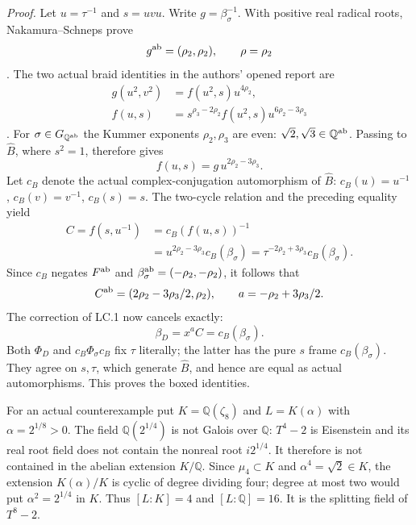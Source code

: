 \emph{Proof.}
Let $u=\tau^{-1}$ and $s=uvu$. Write $g=\beta_\sigma^{-1}$.
With positive real radical roots, Nakamura--Schneps prove
\[
 g^{\rm ab}=(\rho_2,\rho_2),\qquad \rho=\rho_2
\]
\cite[Proposition~2.4 and Definition~5.1]{LiftNakamuraSchneps2000}.
The two actual braid identities in the authors' opened report are
\begin{align*}
 g(u^2,v^2)&=f(u^2,s)u^{4\rho_2},\\
 f(u,s)&=s^{\rho_3-2\rho_2}f(u^2,s)u^{6\rho_2-3\rho_3}
\end{align*}
\cite[Theorem~2, $(\mathrm{GF}_1)$; Theorem~1, $(\mathrm V)$]
{LiftTsunogaiNakamura2002}.
For $\sigma\in G_{\mathbb Q^{\rm ab}}$ the Kummer exponents
$\rho_2,\rho_3$ are even: $\sqrt2,\sqrt3\in\mathbb Q^{\rm ab}$.
Passing to $\widehat B$, where $s^2=1$, therefore gives
\[
 f(u,s)=g\,u^{2\rho_2-3\rho_3}.
\]
Let $c_B$ denote the actual complex-conjugation automorphism of
$\widehat B$: $c_B(u)=u^{-1}$, $c_B(v)=v^{-1}$, $c_B(s)=s$.
The two-cycle relation and the preceding equality yield
\begin{align*}
 C=f(s,u^{-1})
   &=c_B(f(u,s))^{-1}\\
   &=u^{2\rho_2-3\rho_3}c_B(\beta_\sigma)
     =\tau^{-2\rho_2+3\rho_3}c_B(\beta_\sigma).
\end{align*}
Since $c_B$ negates $F^{\rm ab}$ and $\beta_\sigma^{\rm ab}
=(-\rho_2,-\rho_2)$, it follows that
\[
 C^{\rm ab}=(2\rho_2-3\rho_3/2,\rho_2),\qquad
 a=-\rho_2+3\rho_3/2.
\]
The correction of LC.1 now cancels exactly:
\[
 \beta_D=x^aC=c_B(\beta_\sigma).
\]
Both $\Phi_D$ and $c_B\Phi_\sigma c_B$ fix $\tau$ literally;
the latter has the pure $s$ frame $c_B(\beta_\sigma)$.
They agree on $s,\tau$, which generate $\widehat B$, and hence are
equal as actual automorphisms. This proves the boxed identities.

For an actual counterexample put $K=\mathbb Q(\zeta_8)$ and
$L=K(\alpha)$ with $\alpha=2^{1/8}>0$. The field
$\mathbb Q(2^{1/4})$ is not Galois over $\mathbb Q$:
$T^4-2$ is Eisenstein and its real root field does not contain
the nonreal root $i2^{1/4}$. It therefore is not contained in
the abelian extension $K/\mathbb Q$. Since $\mu_4\subset K$
and $\alpha^4=\sqrt2\in K$, the extension $K(\alpha)/K$
is cyclic of degree dividing four; degree at most two would
put $\alpha^2=2^{1/4}$ in $K$. Thus $[L:K]=4$ and
$[L:\mathbb Q]=16$. It is the splitting field of $T^8-2$.


